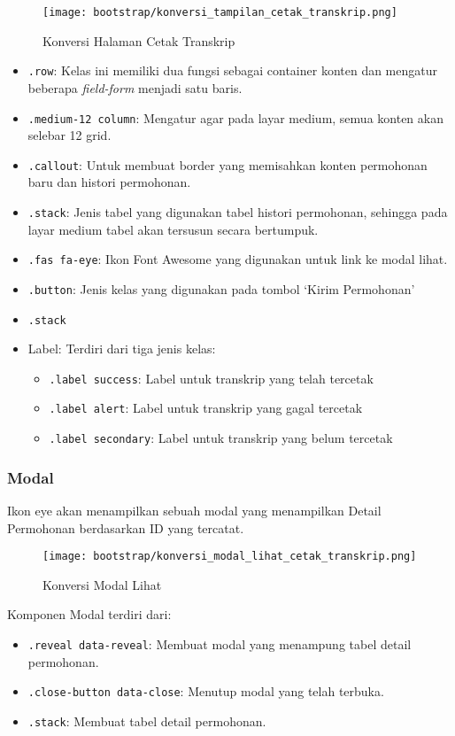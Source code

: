 \begin{figure} [H]
	\centering  
	\texttt{[image: bootstrap/konversi\_tampilan\_cetak\_transkrip.png]}
	\caption{Konversi Halaman Cetak Transkrip} 
\end{figure}
\begin{itemize}
	\item \texttt{.row}: Kelas ini memiliki dua fungsi sebagai container konten dan mengatur beberapa \textit{field-form} menjadi satu baris. 
	\item \texttt{.medium-12 column}: Mengatur agar pada layar medium, semua konten akan selebar 12 grid.
	\item \texttt{.callout}: Untuk membuat border yang memisahkan konten permohonan baru dan histori permohonan.
	\item \texttt{.stack}: Jenis tabel yang digunakan tabel histori permohonan, sehingga pada layar medium tabel akan tersusun secara bertumpuk.
	\item \texttt{.fas fa-eye}: Ikon Font Awesome yang digunakan untuk link ke modal lihat.
	\item \texttt{.button}: Jenis kelas yang digunakan pada tombol `Kirim Permohonan'
	\item \texttt{.stack}
	\item Label: Terdiri dari tiga jenis kelas:
	\begin{itemize}
		\item \texttt{.label success}: Label untuk transkrip yang telah tercetak
		\item \texttt{.label alert}: Label untuk transkrip yang gagal tercetak
		\item \texttt{.label secondary}: Label untuk transkrip yang belum tercetak
	\end{itemize}
	
\end{itemize}
\subsubsection{Modal}
Ikon eye akan menampilkan sebuah modal yang menampilkan Detail Permohonan berdasarkan ID yang tercatat.
\begin{figure} [H]
	\centering  
	\texttt{[image: bootstrap/konversi\_modal\_lihat\_cetak\_transkrip.png]}  
	\caption{Konversi Modal Lihat} 
\end{figure}

Komponen Modal terdiri dari:
\begin{itemize}
	\item \texttt{.reveal data-reveal}: Membuat modal yang menampung tabel detail permohonan.
	\item \texttt{.close-button data-close}: Menutup modal yang telah terbuka.
	\item \texttt{.stack}:	Membuat tabel detail permohonan.
\end{itemize}
